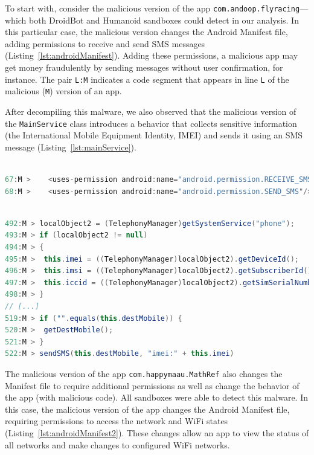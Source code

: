 To start with, consider the malicious version of the app \texttt{com.andoop.flyracing}---which both DroidBot and
Humanoid sandboxes could detect in our analysis. 
In this particular case, the malicious version changes the Android Manifest file,
adding permissions to receive and send SMS messages
(Listing~\ref{lst:androidManifest}). Adding these permissions, a malicious app may get money
fraudulently by sending messages without user confirmation, for instance.
The pair \texttt{L:M} indicates
a code segment that appears in line \texttt{L} of the malicious (\texttt{M})
version of an app.

After decompiling this malware, we also observed that the malicious version of the
\texttt{MainService} class introduces a
behavior that collects sensitive information (the International Mobile
Equipment Identity, IMEI) and sends it using an SMS message
(Listing~\ref{lst:mainService}). 

\begin{lstlisting}[caption={Diffs in the \texttt{com.gau.screenguru.finger}
      AndroidManifest file of the malicious
      version}, language=Java,
    basicstyle=\fontsize{8}{6}\selectfont\ttfamily,
    label={lst:androidManifest}]

67:M >    <uses-permission android:name="android.permission.RECEIVE_SMS"/>
68:M >    <uses-permission android:name="android.permission.SEND_SMS"/>
\end{lstlisting}

\begin{lstlisting}[caption={Diffs in the malicious version
      of the class \texttt{com.android.main.MainService}
      (app \texttt{com.gau.screenguru.finger})},
      language=Java, basicstyle=\fontsize{8}{6}\selectfont\ttfamily,
      label={lst:mainService}]

492:M > localObject2 = (TelephonyManager)getSystemService("phone");
493:M > if (localObject2 != null)
494:M > {
495:M >  this.imei = ((TelephonyManager)localObject2).getDeviceId();
496:M >  this.imsi = ((TelephonyManager)localObject2).getSubscriberId();
497:M >  this.iccid = ((TelephonyManager)localObject2).getSimSerialNumber();
498:M > }
// [...]
519:M > if ("".equals(this.destMobile)) {
520:M >  getDestMobile();
521:M > }
522:M > sendSMS(this.destMobile, "imei:" + this.imei)
\end{lstlisting}

The malicious version of the app \texttt{com.happymaau.MathRef} also changes
the Manifest file to require additional permissions as well as change
the behavior of the app (with malicious code). All sandboxes were able to
detect this malware.
In this case, the malicious version of the app changes the Android Manifest file,
requiring permissions to access the network and WiFi states (Listing~\ref{lst:androidManifest2}).
These changes allow an app
to view the status of all networks and make changes to configured WiFi networks. 


